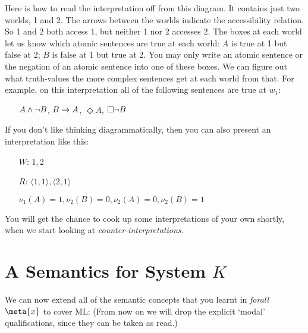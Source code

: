 \noindent Here is how to read the interpretation off from this diagram. It contains just two worlds, 1 and 2. The arrows between the worlds indicate the accessibility relation. So 1 and 2 both access 1, but neither 1 nor 2 accesses 2. The boxes at each world let us know which atomic sentences are true at each world: $A$ is true at 1 but false at 2; $B$ is false at 1 but true at 2. You may only write an atomic sentence or the negation of an atomic sentence into one of these boxes. We can figure out what truth-values the more complex sentences get at each world from that. For example, on this interpretation all of the following sentences are true at $w_1$:
\begin{itemize}
\item[]$A\wedge\neg B$, $B\rightarrow A$, $\Diamond A$, $\Box\neg B$
\end{itemize}
If you don't like thinking diagrammatically, then you can also present an interpretation like this:
\begin{itemize}
\item[$W$:]$1,2$
\item[$R$:]$\langle 1,1\rangle, \langle 2,1\rangle$
\item[]$\nu_{1}(A)=1, \nu_{2}(B)=0, \nu_{2}(A)=0, \nu_{2}(B)=1$
\end{itemize}
You will get the chance to cook up some interpretations of your own shortly, when we start looking at \emph{counter-interpretations}.

\section{A Semantics for System $K$}
\label{SemanticsK}

We can now extend all of the semantic concepts that you learnt in \emph{forall}$\meta{x}$ to cover ML:
(From now on we will drop the explicit `modal' qualifications, since they can be taken as read.)

